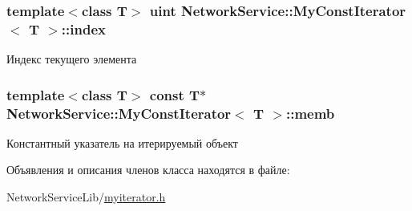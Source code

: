 \subsubsection[{index}]{\setlength{\rightskip}{0pt plus 5cm}template$<$class T$>$ uint {\bf Network\+Service\+::\+My\+Const\+Iterator}$<$ T $>$\+::index\hspace{0.3cm}{\ttfamily [private]}}\label{class_network_service_1_1_my_const_iterator_a9350ef04e3633db10f91f6662d1df1a4}


Индекс текущего элемента 

\hypertarget{class_network_service_1_1_my_const_iterator_ac9879e15103086204afa1af2aa6341a5}{}
\subsubsection[{memb}]{\setlength{\rightskip}{0pt plus 5cm}template$<$class T$>$ const T$\ast$ {\bf Network\+Service\+::\+My\+Const\+Iterator}$<$ T $>$\+::memb\hspace{0.3cm}{\ttfamily [private]}}\label{class_network_service_1_1_my_const_iterator_ac9879e15103086204afa1af2aa6341a5}


Константный указатель на итерируемый объект 



Объявления и описания членов класса находятся в файле\+:\begin{DoxyCompactItemize}
\item 
Network\+Service\+Lib/\hyperlink{myiterator_8h}{myiterator.\+h}\end{DoxyCompactItemize}
